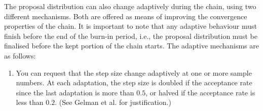 The proposal distribution can also change adaptively during the chain, using two different mechanisms. Both are offered as means of improving the convergence properties of the chain. It is important to note that any adaptive behaviour must finish before the end of the burn-in period, i.e., the proposal distribution must be finalised before the kept portion of the chain starts. The adaptive mechanisms are as follows: 

\begin{enumerate}
\item You can request that the step size change adaptively at one or more sample numbers. At each adaptation, the step size is doubled if the acceptance rate since the last adaptation is more than $0.5$, or halved if the acceptance rate is less than $0.2$. (See Gelman et al. \citep{823} for justification.)

\end{enumerate}




